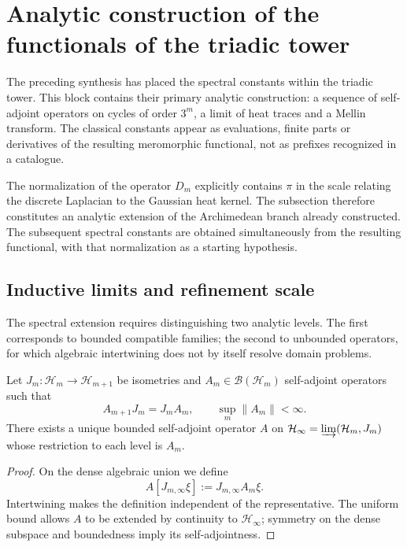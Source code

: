 \chapter{Analytic construction of the functionals of the triadic tower}
\label{chap:funcionales-espectrales-triadicos}

The preceding synthesis has placed the spectral constants within the
triadic tower. This block contains their primary analytic construction:
a sequence of self-adjoint operators on cycles of order \(3^m\), a limit of
heat traces and a Mellin transform. The classical constants appear
as evaluations, finite parts or derivatives of the resulting meromorphic
functional, not as prefixes recognized in a catalogue.

The normalization of the operator $D_m$ explicitly contains $\pi$ in the scale
relating the discrete Laplacian to the Gaussian heat kernel. The
subsection therefore constitutes an analytic extension of the Archimedean
branch already constructed. The subsequent spectral constants are obtained
simultaneously from the resulting functional, with that normalization as a starting
hypothesis.

\section{Inductive limits and refinement scale}

The spectral extension requires distinguishing two analytic levels. The
first corresponds to bounded compatible families; the second to
unbounded operators, for which algebraic intertwining does not
by itself resolve domain problems.

\begin{theorem}
\label{pf84:E03-06}
Let \(J_m:\mathcal H_m\to\mathcal H_{m+1}\) be isometries and
\(A_m\in\mathcal B(\mathcal H_m)\) self-adjoint operators such that
\[
 A_{m+1}J_m=J_mA_m,
 \qquad
 \sup_m\lVert A_m\rVert<\infty.
\]
There exists a unique bounded self-adjoint operator \(A\) on
\(\mathcal H_\infty=\varinjlim(\mathcal H_m,J_m)\) whose restriction to each
level is \(A_m\).
\end{theorem}

\begin{proof}
On the dense algebraic union we define
\[
 A[J_{m,\infty}\xi]:=J_{m,\infty}A_m\xi.
\]
Intertwining makes the definition independent of the representative. The
uniform bound allows \(A\) to be extended by continuity to
\(\mathcal H_\infty\); symmetry on the dense subspace and boundedness
imply its self-adjointness.
\end{proof}


